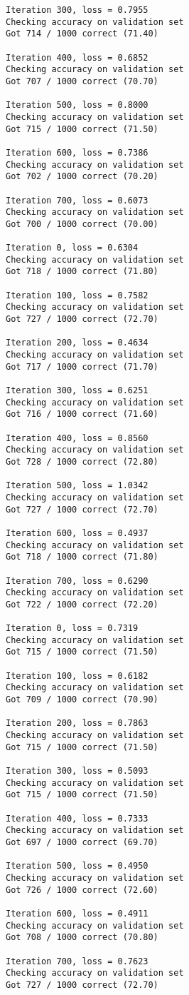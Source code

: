 \documentclass[11pt]{article}
\begin{document}
\begin{Verbatim}[commandchars=\\\{\}]
Iteration 300, loss = 0.7955
Checking accuracy on validation set
Got 714 / 1000 correct (71.40)

Iteration 400, loss = 0.6852
Checking accuracy on validation set
Got 707 / 1000 correct (70.70)

Iteration 500, loss = 0.8000
Checking accuracy on validation set
Got 715 / 1000 correct (71.50)

Iteration 600, loss = 0.7386
Checking accuracy on validation set
Got 702 / 1000 correct (70.20)

Iteration 700, loss = 0.6073
Checking accuracy on validation set
Got 700 / 1000 correct (70.00)

Iteration 0, loss = 0.6304
Checking accuracy on validation set
Got 718 / 1000 correct (71.80)

Iteration 100, loss = 0.7582
Checking accuracy on validation set
Got 727 / 1000 correct (72.70)

Iteration 200, loss = 0.4634
Checking accuracy on validation set
Got 717 / 1000 correct (71.70)

Iteration 300, loss = 0.6251
Checking accuracy on validation set
Got 716 / 1000 correct (71.60)

Iteration 400, loss = 0.8560
Checking accuracy on validation set
Got 728 / 1000 correct (72.80)

Iteration 500, loss = 1.0342
Checking accuracy on validation set
Got 727 / 1000 correct (72.70)

Iteration 600, loss = 0.4937
Checking accuracy on validation set
Got 718 / 1000 correct (71.80)

Iteration 700, loss = 0.6290
Checking accuracy on validation set
Got 722 / 1000 correct (72.20)

Iteration 0, loss = 0.7319
Checking accuracy on validation set
Got 715 / 1000 correct (71.50)

Iteration 100, loss = 0.6182
Checking accuracy on validation set
Got 709 / 1000 correct (70.90)

Iteration 200, loss = 0.7863
Checking accuracy on validation set
Got 715 / 1000 correct (71.50)

Iteration 300, loss = 0.5093
Checking accuracy on validation set
Got 715 / 1000 correct (71.50)

Iteration 400, loss = 0.7333
Checking accuracy on validation set
Got 697 / 1000 correct (69.70)

Iteration 500, loss = 0.4950
Checking accuracy on validation set
Got 726 / 1000 correct (72.60)

Iteration 600, loss = 0.4911
Checking accuracy on validation set
Got 708 / 1000 correct (70.80)

Iteration 700, loss = 0.7623
Checking accuracy on validation set
Got 727 / 1000 correct (72.70)

    \end{Verbatim}
\end{document}
